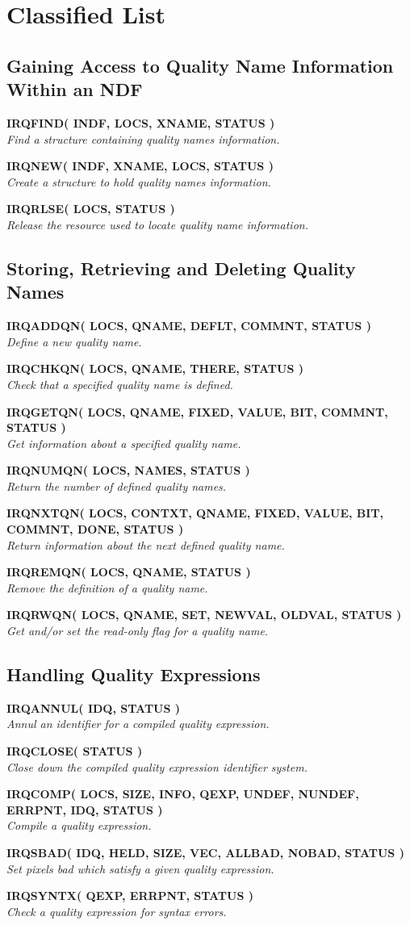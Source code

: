 \documentclass[twoside,11pt]{article}
\newcommand{\noteroutine}[2]{\textbf{#1}\hspace*{\fill}\nopagebreak \\
                             \hspace*{3em}\emph{#2}\hspace*{\fill}\par}
\renewcommand{\_}{\texttt{\symbol{95}}}
\begin{document}
\newpage
\section {Classified List}

\subsection{Gaining Access to Quality Name Information Within an NDF}
\noteroutine{IRQ\_FIND( INDF, LOCS, XNAME, STATUS )}
   {Find a structure containing quality names information.}
\noteroutine{IRQ\_NEW( INDF, XNAME, LOCS, STATUS )}
   {Create a structure to hold quality names information.}
\noteroutine{IRQ\_RLSE( LOCS, STATUS )}
   {Release the resource used to locate quality name information.}

\subsection{Storing, Retrieving and Deleting Quality Names}
\noteroutine{IRQ\_ADDQN( LOCS, QNAME, DEFLT, COMMNT, STATUS )}
   {Define a new quality name.}
\noteroutine{IRQ\_CHKQN( LOCS, QNAME, THERE, STATUS )}
   {Check that a specified quality name is defined.}
\noteroutine{IRQ\_GETQN( LOCS, QNAME, FIXED, VALUE, BIT, COMMNT, STATUS )}
   {Get information about a specified quality name.}
\noteroutine{IRQ\_NUMQN( LOCS, NAMES, STATUS )}
   {Return the number of defined quality names.}
\noteroutine{IRQ\_NXTQN( LOCS, CONTXT, QNAME, FIXED, VALUE, BIT, COMMNT, DONE, STATUS )}
   {Return information about the next defined quality name.}
\noteroutine{IRQ\_REMQN( LOCS, QNAME, STATUS )}
   {Remove the definition of a quality name.}
\noteroutine{IRQ\_RWQN( LOCS, QNAME, SET, NEWVAL, OLDVAL, STATUS )}
   {Get and/or set the read-only flag for a quality name.}

\subsection{Handling Quality Expressions}
\noteroutine{IRQ\_ANNUL( IDQ, STATUS )}
   {Annul an identifier for a compiled quality expression.}
\noteroutine{IRQ\_CLOSE( STATUS )}
   {Close down the compiled quality expression identifier system.}
\noteroutine{IRQ\_COMP( LOCS, SIZE, INFO, QEXP, UNDEF, NUNDEF, ERRPNT, IDQ, STATUS )}
   {Compile a quality expression.}
\noteroutine{IRQ\_SBAD( IDQ, HELD, SIZE, VEC, ALLBAD, NOBAD, STATUS )}
   {Set pixels bad which satisfy a given quality expression.}
\noteroutine{IRQ\_SYNTX( QEXP, ERRPNT, STATUS )}
   {Check a quality expression for syntax errors.}
\end{document}

